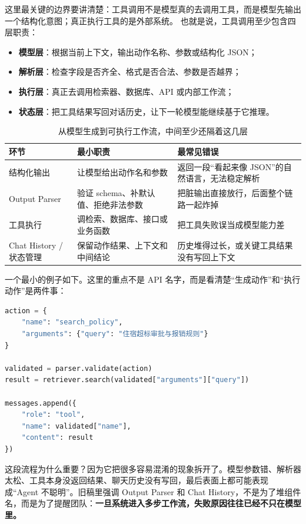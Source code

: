 这里最关键的边界要讲清楚：{\heiti 工具调用不是模型真的去调用工具，而是模型先输出一个结构化意图；真正执行工具的是外部系统。} 也就是说，工具调用至少包含四层职责：
\begin{itemize}
  \item \textbf{模型层}：根据当前上下文，输出动作名称、参数或结构化 JSON；
  \item \textbf{解析层}：检查字段是否齐全、格式是否合法、参数是否越界；
  \item \textbf{执行层}：真正去调用检索器、数据库、API 或内部工作流；
  \item \textbf{状态层}：把工具结果写回对话历史，让下一轮模型能继续基于它推理。
\end{itemize}

\begin{table}[H]
\centering
\small
\begin{tabularx}{\textwidth}{>{\raggedright\arraybackslash}p{2.5cm}>{\raggedright\arraybackslash}p{3.2cm}>{\raggedright\arraybackslash}X}
\toprule
\textbf{环节} & \textbf{最小职责} & \textbf{最常见错误} \\
\midrule
结构化输出 & 让模型给出动作名和参数 & 返回一段“看起来像 JSON”的自然语言，无法稳定解析 \\
Output Parser & 验证 schema、补默认值、拒绝非法参数 & 把脏输出直接放行，后面整个链路一起炸掉 \\
工具执行 & 调检索、数据库、接口或业务函数 & 把工具失败误当成模型能力差 \\
Chat History / 状态管理 & 保留动作结果、上下文和中间结论 & 历史堆得过长，或关键工具结果没有写回上下文 \\
\bottomrule
\end{tabularx}
\caption{从模型生成到可执行工作流，中间至少还隔着这几层}
\label{tab:tool-calling-stack}
\end{table}

一个最小的例子如下。这里的重点不是 API 名字，而是看清楚“生成动作”和“执行动作”是两件事：
\begin{lstlisting}[language=Python]
action = {
    "name": "search_policy",
    "arguments": {"query": "住宿超标审批与报销规则"}
}

validated = parser.validate(action)
result = retriever.search(validated["arguments"]["query"])

messages.append({
    "role": "tool",
    "name": validated["name"],
    "content": result
})
\end{lstlisting}

这段流程为什么重要？因为它把很多容易混淆的现象拆开了。模型参数错、解析器太松、工具本身没返回结果、聊天历史没有写回，最后表面上都可能表现成“Agent 不聪明”。旧稿里强调 Output Parser 和 Chat History，不是为了堆组件名，而是为了提醒团队：\textbf{一旦系统进入多步工作流，失败原因往往已经不只在模型里。}

